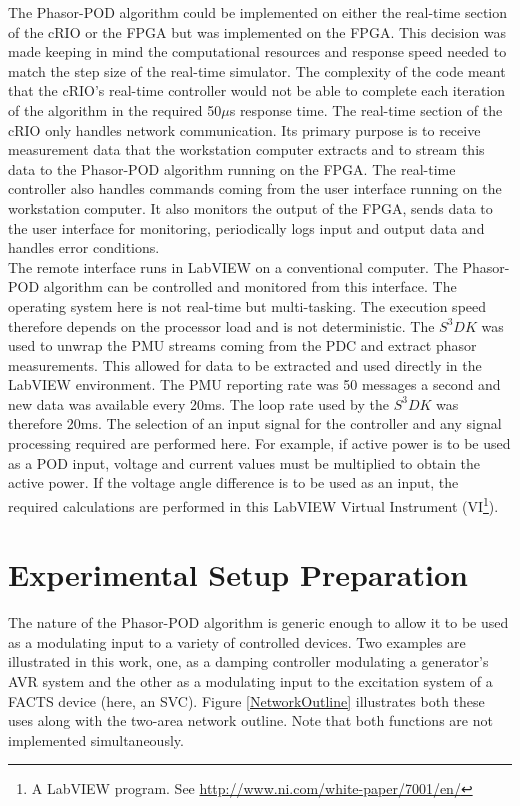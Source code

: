 \documentclass{ieeeaccess}
\begin{document}
The Phasor-POD algorithm could be implemented on either the real-time section of the cRIO or the FPGA but was implemented on the FPGA. This decision was made keeping in mind the computational resources and response speed needed to match the step size of the real-time simulator. The complexity of the code meant that the cRIO\rq{s} real-time controller would not be able to complete each iteration of the algorithm in the required 50$\mu$s response time. The real-time section of the cRIO only handles network communication. Its primary purpose is to receive measurement data that the workstation computer extracts and to stream this data to the Phasor-POD algorithm running on the FPGA. The real-time controller also handles commands coming from the user interface running on the workstation computer.  It also monitors the output of the FPGA, sends data to the user interface for monitoring, periodically logs input and output data and handles error conditions.\\

The remote interface runs in LabVIEW on a conventional computer. The Phasor-POD algorithm can be controlled and monitored from this interface. The operating system here is not real-time but multi-tasking. The execution speed therefore depends on the processor load and is not deterministic. The  $S^{3}DK$ was used to unwrap the PMU streams coming from the PDC and extract phasor measurements. This allowed for data to be extracted and used directly in the LabVIEW environment. The PMU reporting rate was 50 messages a second and new data was available every 20ms. The loop rate used by the $S^{3}DK$ was therefore 20ms. The selection of an input signal for the controller and any signal processing required are performed here. For example, if active power is to be used as a POD input, voltage and current values must be multiplied to obtain the active power. If the voltage angle difference is to be used as an input, the required calculations are performed in this LabVIEW Virtual Instrument (VI\footnote{A LabVIEW program. See \underline{http://www.ni.com/white-paper/7001/en/}}).

\section{Experimental Setup Preparation}\label{SetupPreparation}

The nature of the Phasor-POD algorithm is generic enough to allow it to be used as a modulating input to a variety of controlled devices. Two examples are illustrated in this work, one, as a damping controller modulating a generator\rq{s} AVR system and the other as a modulating input to the excitation system of a FACTS device (here, an SVC). Figure \ref{NetworkOutline} illustrates both these uses along with the two-area network outline. Note that both functions are not implemented simultaneously.
\end{document}
